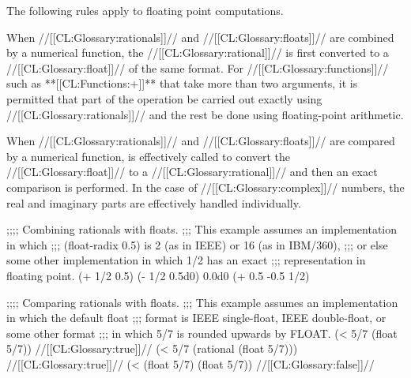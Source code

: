 The following rules apply to floating point computations.















When //[[CL:Glossary:rationals]]// and //[[CL:Glossary:floats]]// are combined by a numerical function, 
the //[[CL:Glossary:rational]]// is first converted to a //[[CL:Glossary:float]]// of the same format.
For //[[CL:Glossary:functions]]// such as **[[CL:Functions:+]]** that take more than two arguments,
it is permitted that part of the operation be carried out exactly using
//[[CL:Glossary:rationals]]// and the rest be done using floating-point arithmetic.

When //[[CL:Glossary:rationals]]// and //[[CL:Glossary:floats]]// are compared by a numerical function, 
 is effectively called to convert the //[[CL:Glossary:float]]// 
to a //[[CL:Glossary:rational]]// and then an exact
comparison is performed. In the case of //[[CL:Glossary:complex]]// numbers,
the real and imaginary parts are effectively handled individually.


\code
 ;;;; Combining rationals with floats.
 ;;; This example assumes an implementation in which 
 ;;; (float-radix 0.5) is 2 (as in IEEE) or 16 (as in IBM/360),
 ;;; or else some other implementation in which 1/2 has an exact 
 ;;;  representation in floating point.
 (+ 1/2 0.5) 
 (- 1/2 0.5d0) \EV 0.0d0
 (+ 0.5 -0.5 1/2) 

 ;;;; Comparing rationals with floats.
 ;;; This example assumes an implementation in which the default float 
 ;;; format is IEEE single-float, IEEE double-float, or some other format
 ;;; in which 5/7 is rounded upwards by FLOAT.
 (< 5/7 (float 5/7)) \EV //[[CL:Glossary:true]]//
 (< 5/7 (rational (float 5/7))) \EV //[[CL:Glossary:true]]//
 (< (float 5/7) (float 5/7)) \EV //[[CL:Glossary:false]]//
\endcode





\endsubsubsection%



